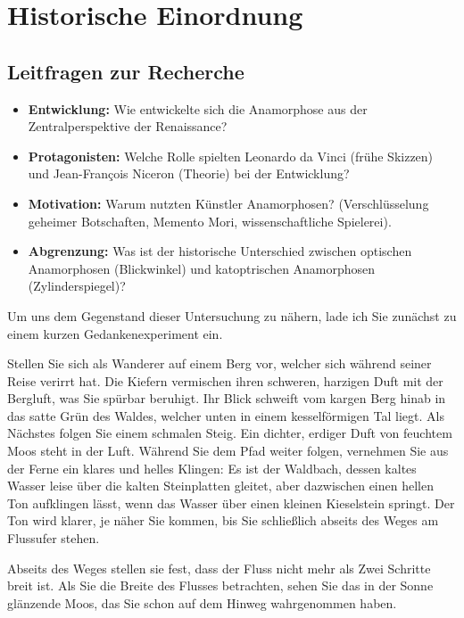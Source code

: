 \section{Historische Einordnung}

\subsection*{Leitfragen zur Recherche}
\begin{itemize}
    \item \textbf{Entwicklung:} Wie entwickelte sich die Anamorphose aus der Zentralperspektive der Renaissance?
    \item \textbf{Protagonisten:} Welche Rolle spielten Leonardo da Vinci (frühe Skizzen) und Jean-François Niceron (Theorie) bei der Entwicklung?
    \item \textbf{Motivation:} Warum nutzten Künstler Anamorphosen? (Verschlüsselung geheimer Botschaften, Memento Mori, wissenschaftliche Spielerei).
    \item \textbf{Abgrenzung:} Was ist der historische Unterschied zwischen optischen Anamorphosen (Blickwinkel) und katoptrischen Anamorphosen (Zylinderspiegel)?
\end{itemize}

Um uns dem Gegenstand dieser Untersuchung zu nähern, lade ich Sie zunächst zu einem kurzen Gedankenexperiment ein.

Stellen Sie sich als Wanderer auf einem Berg vor, welcher sich während seiner Reise verirrt hat. Die Kiefern vermischen ihren schweren, harzigen Duft mit der Bergluft, was Sie spürbar beruhigt. Ihr Blick schweift vom kargen Berg hinab in das satte Grün des Waldes, welcher unten in einem kesselförmigen Tal liegt. Als Nächstes folgen Sie einem schmalen Steig. Ein dichter, erdiger Duft von feuchtem Moos steht in der Luft. Während Sie dem Pfad weiter folgen, vernehmen Sie aus der Ferne ein klares und helles Klingen: Es ist der Waldbach, dessen kaltes Wasser leise über die kalten Steinplatten gleitet, aber dazwischen einen hellen Ton aufklingen lässt, wenn das Wasser über einen kleinen Kieselstein springt. Der Ton wird klarer, je näher Sie kommen, bis Sie schließlich abseits des Weges am Flussufer stehen.

Abseits des Weges stellen sie fest, dass der Fluss nicht mehr als Zwei Schritte breit ist. Als Sie die Breite des Flusses betrachten, sehen Sie das in der Sonne glänzende Moos, das Sie schon auf dem Hinweg wahrgenommen haben.

